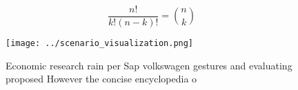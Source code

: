 \documentclass[a4paper]{article}
\begin{document}
\[ \frac{n!}{k!(n-k)!} = \binom{n}{k} \]

\begin{figure}
\centering
\texttt{[image: ../scenario\_visualization.png]}
\caption{Economic research rain per Sap volkswagen gestures and evaluating proposed However the concise encyclopedia o
}
\end{figure}
 
\end{document}
